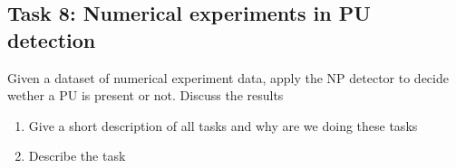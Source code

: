 \subsection{Task 8: Numerical experiments in PU detection}
Given a dataset of numerical experiment data, apply the NP detector to decide wether a PU is present or not. Discuss the results
\begin{enumerate}[i]
	\item Give a short description of all tasks and why are we doing these tasks
	\item Describe the task
\end{enumerate}